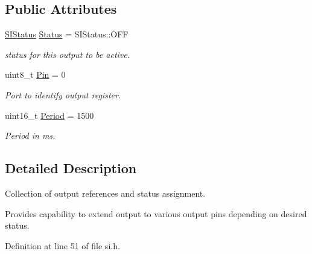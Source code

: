 \subsection*{Public Attributes}
\begin{DoxyCompactItemize}
\item 
\hyperlink{classSPMB_1_1StatusIndicator_a6d5ae5d45a9147ec76bd72da143fb4de}{S\+I\+Status} \hyperlink{structSPMB_1_1StatusIndicator_1_1StatusOutput_af616c94b4f3a6d8151eb062594a79598}{Status} = S\+I\+Status\+::\+O\+FF\hypertarget{structSPMB_1_1StatusIndicator_1_1StatusOutput_af616c94b4f3a6d8151eb062594a79598}{}\label{structSPMB_1_1StatusIndicator_1_1StatusOutput_af616c94b4f3a6d8151eb062594a79598}

\begin{DoxyCompactList}\small\item\em status for this output to be active. \end{DoxyCompactList}\item 
uint8\+\_\+t \hyperlink{structSPMB_1_1StatusIndicator_1_1StatusOutput_a042f8a5ff5a57c0b9bbc6fd293adb81a}{Pin} = 0\hypertarget{structSPMB_1_1StatusIndicator_1_1StatusOutput_a042f8a5ff5a57c0b9bbc6fd293adb81a}{}\label{structSPMB_1_1StatusIndicator_1_1StatusOutput_a042f8a5ff5a57c0b9bbc6fd293adb81a}

\begin{DoxyCompactList}\small\item\em Port to identify output register. \end{DoxyCompactList}\item 
uint16\+\_\+t \hyperlink{structSPMB_1_1StatusIndicator_1_1StatusOutput_a3c566b5f9a045d8ae12cea6e28fe10ec}{Period} = 1500\hypertarget{structSPMB_1_1StatusIndicator_1_1StatusOutput_a3c566b5f9a045d8ae12cea6e28fe10ec}{}\label{structSPMB_1_1StatusIndicator_1_1StatusOutput_a3c566b5f9a045d8ae12cea6e28fe10ec}

\begin{DoxyCompactList}\small\item\em Period in ms. \end{DoxyCompactList}\end{DoxyCompactItemize}


\subsection{Detailed Description}
Collection of output references and status assignment. 

Provides capability to extend output to various output pins depending on desired status. 

Definition at line 51 of file si.\+h.

